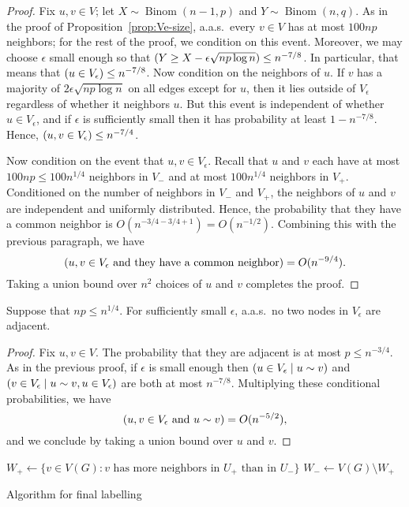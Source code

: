 \documentclass[EJP,final]{ejpecp}
\newcommand{\1}[1]{\mathbbm{1}_{\{#1\}}}
\let\Pr\relax
\DeclareMathOperator{\Pr}{Pr}
\DeclareMathOperator{\Binom}{Binom}
\begin{document}
\begin{proof}
  Fix $u, v \in V$; let $X \sim \Binom(n-1, p)$
  and $Y \sim \Binom(n,q)$. As in the proof of
 Proposition~\ref{prop:Ve-size}, a.a.s.\ every $v \in V$ has at most
 $100np$ neighbors; for the rest of the proof, we condition on this
 event. Moreover, we may choose $\epsilon$
 small enough so that $\Pr(Y \ge X - \epsilon \sqrt{np \log n}) \le n^{-7/8}$.
 In particular, that means that $\Pr(u \in V_\epsilon) \le n^{-7/8}$. Now
 condition on the neighbors of $u$. If $v$ has a majority of
 $2\epsilon \sqrt{np \log n}$ on all edges except for $u$, then it lies outside
 of $V_\epsilon$ regardless of whether it neighbors $u$. But this event
 is independent of whether $u \in V_\epsilon$, and if $\epsilon$ is sufficiently
 small then it has probability
 at least $1-n^{-7/8}$. Hence, $\Pr(u, v \in V_\epsilon) \le n^{-7/4}$.

 Now condition on the event that $u, v \in V_\epsilon$.
 Recall that $u$ and $v$ each
 have at most $100np \le 100n^{1/4}$ neighbors in $V_-$ and at most
 $100n^{1/4}$ neighbors in $V_+$. Conditioned on the number of neighbors in $V_-$
 and $V_+$, the neighbors of $u$ and $v$ are independent and uniformly distributed.
 Hence, the probability that they have a common neighbor is $O(n^{-3/4 - 3/4 + 1})
 = O(n^{-1/2})$. Combining this with the previous paragraph, we have
 \[
  \Pr(u, v \in V_\epsilon \text{ and they have a common neighbor})
  = O(n^{-9/4}).
 \]
 Taking a union bound over $n^2$ choices of $u$ and $v$ completes the proof.
\end{proof}

\begin{proposition}\label{prop:Ve-adjacent}
 Suppose that $np \le n^{1/4}$. For sufficiently small $\epsilon$,
 a.a.s.\ no two nodes in $V_\epsilon$ are adjacent.
\end{proposition}

\begin{proof}
 Fix $u, v \in V$. The probability that they are adjacent
 is at most $p \le n^{-3/4}$.
 As in the previous proof, if $\epsilon$ is small enough
 then $\Pr(u \in V_\epsilon \mid u \sim v)$
 and $\Pr(v \in V_\epsilon \mid u \sim v, u \in V_\epsilon)$
 are both at most $n^{-7/8}$.
 Multiplying these conditional probabilities, we have
 \[
  \Pr(u, v \in V_\epsilon \text{ and } u \sim v)
  = O(n^{-5/2}),
 \]
 and we conclude by taking a union bound over $u$ and $v$.
\end{proof}


\begin{algorithm}
 \LinesNumbered

 \BlankLine

  $W_+ \leftarrow \{v \in V(G): \text{$v$ has more neighbors in $U_+$ than in $U_-$}\}$\;
  $W_- \leftarrow V(G) \setminus W_+$\;

\caption{Algorithm for final labelling}
\label{alg:second}
\end{algorithm}
\end{document}
